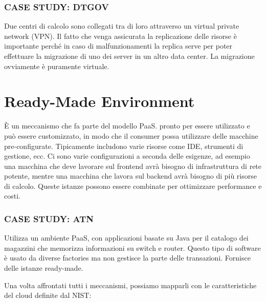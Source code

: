 \subsubsection{\textbf{CASE STUDY: DTGOV}}
Due centri di calcolo sono collegati tra di loro attraverso un virtual private network (VPN). Il fatto che venga assicurata la replicazione delle risorse è importante perché in caso di malfunzionamenti la replica serve per poter effettuare la migrazione di uno dei server in un altro data center. La migrazione ovviamente è puramente virtuale.

\section{Ready-Made Environment}
È un meccanismo che fa parte del modello PaaS. pronto per essere utilizzato e può essere customizzato, in modo che il consumer possa utilizzare delle macchine pre-configurate. Tipicamente includono varie risorse come IDE, strumenti di gestione, ecc. Ci sono varie configurazioni a seconda delle esigenze, ad esempio una macchina che deve lavorare sul frontend avrà bisogno di infrastruttura di rete potente, mentre una macchina che lavora sul backend avrà bisogno di più risorse di calcolo. Queste istanze possono essere combinate per ottimizzare performance e costi.

\subsubsection{\textbf{CASE STUDY: ATN}}
Utilizza un ambiente PaaS, con applicazioni basate su Java per il catalogo dei magazzini che memorizza informazioni su switch e router. Questo tipo di software è usato da diverse factories ma non gestisce la parte delle transazioni. Fornisce delle istanze ready-made.

\vspace{5mm}

Una volta affrontati tutti i meccanismi, possiamo mapparli con le caratteristiche del cloud definite dal NIST:

